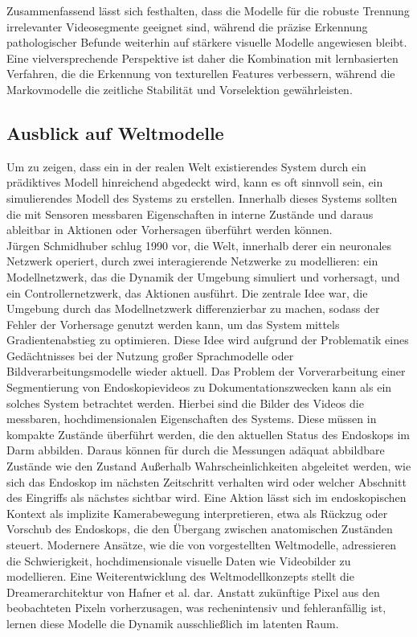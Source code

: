 Zusammenfassend lässt sich festhalten, dass die Modelle für die robuste Trennung irrelevanter Videosegmente geeignet sind, während die präzise Erkennung pathologischer Befunde weiterhin auf stärkere visuelle Modelle angewiesen bleibt. Eine vielversprechende Perspektive ist daher die Kombination mit lernbasierten Verfahren, die die Erkennung von texturellen Features verbessern, während die Markovmodelle die zeitliche Stabilität und Vorselektion gewährleisten.

\subsection{Ausblick auf Weltmodelle}

Um zu zeigen, dass ein in der realen Welt existierendes System durch ein prädiktives Modell hinreichend abgedeckt wird, kann es oft sinnvoll sein, ein simulierendes Modell des Systems zu erstellen. Innerhalb dieses Systems sollten die mit Sensoren messbaren Eigenschaften in interne Zustände und daraus ableitbar in Aktionen oder Vorhersagen überführt werden können.
\\
Jürgen Schmidhuber schlug 1990 vor, die Welt, innerhalb derer ein neuronales Netzwerk operiert, durch zwei interagierende Netzwerke zu modellieren: ein Modellnetzwerk, das die Dynamik der Umgebung simuliert und vorhersagt, und ein Controllernetzwerk, das Aktionen ausführt. Die zentrale Idee war, die Umgebung durch das Modellnetzwerk differenzierbar zu machen, sodass der Fehler der Vorhersage genutzt werden kann, um das System mittels Gradientenabstieg zu optimieren. \cite{schmidhuber1990making} Diese Idee wird aufgrund der Problematik eines Gedächtnisses bei der Nutzung großer Sprachmodelle oder Bildverarbeitungsmodelle wieder aktuell. Das Problem der Vorverarbeitung einer Segmentierung von Endoskopievideos zu Dokumentationszwecken kann als ein solches System betrachtet werden. Hierbei sind die Bilder des Videos die messbaren, hochdimensionalen Eigenschaften des Systems. Diese müssen in kompakte Zustände überführt werden, die den aktuellen Status des Endoskops im Darm abbilden. Daraus können für durch die Messungen adäquat abbildbare Zustände wie den Zustand Außerhalb Wahrscheinlichkeiten abgeleitet werden, wie sich das Endoskop im nächsten Zeitschritt verhalten wird oder welcher Abschnitt des Eingriffs als nächstes sichtbar wird.
Eine Aktion lässt sich im endoskopischen Kontext als implizite Kamerabewegung interpretieren, etwa als Rückzug oder Vorschub des Endoskops, die den Übergang zwischen anatomischen Zuständen steuert. Modernere Ansätze, wie die von \cite{ha2018worldmodels} vorgestellten Weltmodelle, adressieren die Schwierigkeit, hochdimensionale visuelle Daten wie Videobilder zu modellieren. Eine Weiterentwicklung des Weltmodellkonzepts stellt die Dreamerarchitektur von Hafner et al. \citet{hafner2019dreamer} dar. Anstatt zukünftige Pixel aus den beobachteten Pixeln vorherzusagen, was rechenintensiv und fehleranfällig ist, lernen diese Modelle die Dynamik ausschließlich im latenten Raum. 
